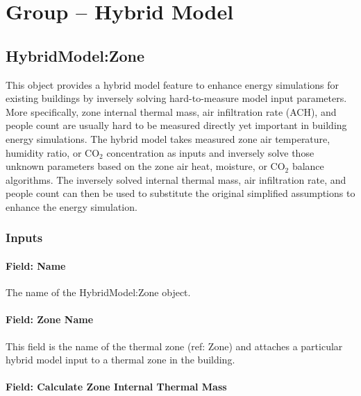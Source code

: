 \section{Group -- Hybrid Model}\label{group-hybrid-model}

\subsection{HybridModel:Zone}\label{inputs-hm}

This object provides a hybrid model feature to enhance energy simulations for existing buildings by inversely solving hard-to-measure model input parameters. More specifically, zone internal thermal mass, air infiltration rate (ACH), and people count are usually hard to be measured directly yet important in building energy simulations. The hybrid model takes measured zone air temperature, humidity ratio, or CO$_2$ concentration as inputs and inversely solve those unknown parameters based on the zone air heat, moisture, or CO$_2$ balance algorithms. The inversely solved internal thermal mass, air infiltration rate, and people count can then be used to substitute the original simplified assumptions to enhance the energy simulation.

\subsubsection{Inputs}\label{inputs-hybridzone}

\paragraph{Field: Name}\label{field-name-hm}

The name of the HybridModel:Zone object.

\paragraph{Field: Zone Name}\label{field-zone-name-hm}

This field is the name of the thermal zone (ref: Zone) and attaches a particular hybrid model input to a thermal zone in the building.

\paragraph{Field: Calculate Zone Internal Thermal Mass}\label{field-calculate-zon-internal-thermal-mass-hm}

